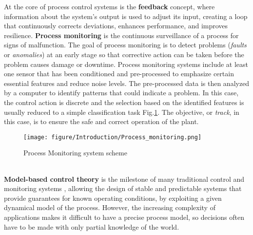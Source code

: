At the core of  process control systems is the \textbf{feedback} concept, where information about the system's output is used to adjust its input, creating a loop that continuously corrects deviations, enhances performance, and improves resilience. 
\textbf{Process monitoring }is the continuous surveillance of a process for signs of malfunction. The goal of process monitoring is to detect problems (\textit{faults} or \textit{anomalies}) at an early stage so that corrective action can be taken before the problem causes damage or downtime.
Process monitoring systems include at least one sensor that has been conditioned and pre-processed to emphasize certain essential features and reduce noise levels. The pre-processed data is then analyzed by a computer to identify patterns that could indicate a problem.
In this case, the control action is discrete and the selection based on the identified features is usually reduced to a simple classification task Fig.\ref{fig: Process Monitoring System}. The objective, or \textit{track}, in this case, is to ensure the safe and correct operation of the plant.
\begin{figure}[ht]
    \centering
    \texttt{[image: figure/Introduction/Process\_monitoring.png]}
    \caption{Process Monitoring system scheme}
    \label{fig: Process Monitoring System}
\end{figure} \\
\textbf{Model-based control theory} is the milestone of many  traditional control and monitoring systems , allowing the design of stable and predictable systems that provide guarantees for known operating conditions, by exploiting a given dynamical model of the process. However, the increasing complexity of applications makes it difficult to have a precise process model, so decisions often have to be made with only partial knowledge of the world.  


